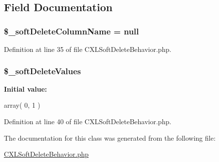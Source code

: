 \subsection{Field Documentation}
\hypertarget{classCXLSoftDeleteBehavior_a9763b131149e72b641d056ae5e693502}{
\subsubsection[{\$\_\-softDeleteColumnName}]{\setlength{\rightskip}{0pt plus 5cm}\$\_\-softDeleteColumnName = null}}
\label{classCXLSoftDeleteBehavior_a9763b131149e72b641d056ae5e693502}


Definition at line 35 of file CXLSoftDeleteBehavior.php.

\hypertarget{classCXLSoftDeleteBehavior_a5c8f6d3104b63b74d01187b6a400106b}{
\subsubsection[{\$\_\-softDeleteValues}]{\setlength{\rightskip}{0pt plus 5cm}\$\_\-softDeleteValues}}
\label{classCXLSoftDeleteBehavior_a5c8f6d3104b63b74d01187b6a400106b}
{\bfseries Initial value:}
\begin{DoxyCode}
 array( 
    0, 
    1
  )
\end{DoxyCode}


Definition at line 40 of file CXLSoftDeleteBehavior.php.



The documentation for this class was generated from the following file:\begin{DoxyCompactItemize}
\item 
\hyperlink{CXLSoftDeleteBehavior_8php}{CXLSoftDeleteBehavior.php}\end{DoxyCompactItemize}
